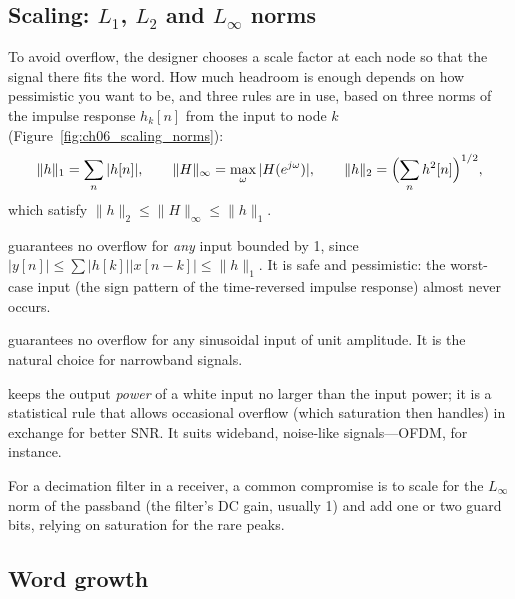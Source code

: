 \subsection{Scaling: \texorpdfstring{$L_1$}{L1}, \texorpdfstring{$L_2$}{L2} and \texorpdfstring{$L_\infty$}{L-infinity} norms}

To avoid overflow, the designer chooses a scale factor at each node so that the signal there fits
the word. How much headroom is enough depends on how pessimistic you want to be, and three rules are
in use, based on three norms of the impulse response $h_k[n]$ from the input to node $k$
(Figure~\ref{fig:ch06_scaling_norms}):
\begin{equation}
\|h\|_1=\sum_n|h[n]|,\qquad
\|H\|_\infty=\max_\omega|H(e^{j\omega})|,\qquad
\|h\|_2=\Bigl(\sum_nh^2[n]\Bigr)^{1/2},
\end{equation}
which satisfy $\|h\|_2\le\|H\|_\infty\le\|h\|_1$.
\begin{description}[style=nextline,leftmargin=1.2em,font=\sffamily\bfseries\small\color{navy}]
\item[$L_1$ scaling] guarantees no overflow for \emph{any} input bounded by 1, since
$|y[n]|\le\sum|h[k]||x[n-k]|\le\|h\|_1$. It is safe and pessimistic: the worst-case input (the sign
pattern of the time-reversed impulse response) almost never occurs.
\item[$L_\infty$ scaling] guarantees no overflow for any sinusoidal input of unit amplitude. It is
the natural choice for narrowband signals.
\item[$L_2$ scaling] keeps the output \emph{power} of a white input no larger than the input power;
it is a statistical rule that allows occasional overflow (which saturation then handles) in
exchange for better SNR. It suits wideband, noise-like signals---OFDM, for instance.
\end{description}
For a decimation filter in a receiver, a common compromise is to scale for the $L_\infty$ norm of
the passband (the filter's DC gain, usually 1) and add one or two guard bits, relying on saturation
for the rare peaks.


\subsection{Word growth}

